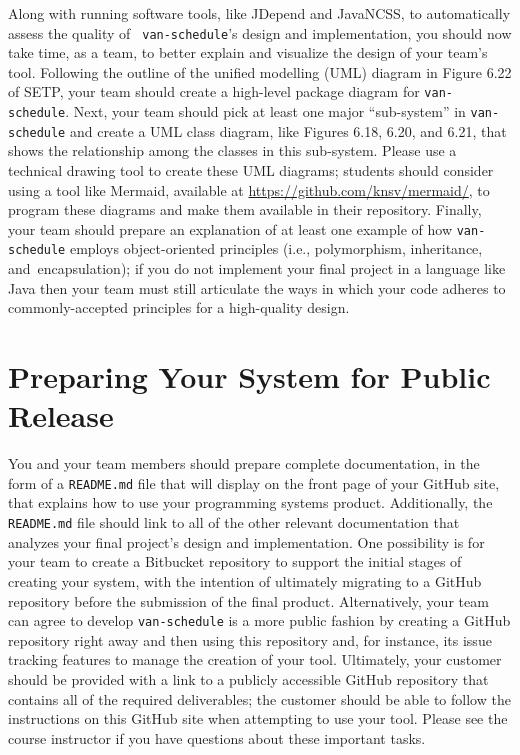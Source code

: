 Along with running software tools, like JDepend and JavaNCSS, to automatically assess the quality of {\tt
van-schedule}'s design and implementation, you should now take time, as a team, to better explain and visualize the
design of your team's tool. Following the outline of the unified modelling (UML) diagram in Figure 6.22 of SETP,
your team should create a high-level package diagram for {\tt van-schedule}. Next, your team should pick at least one
major ``sub-system'' in {\tt van-schedule} and create a UML class diagram, like Figures 6.18, 6.20, and 6.21, that shows
the relationship among the classes in this sub-system. Please use a technical drawing tool to create these UML diagrams;
students should consider using a tool like Mermaid, available at \url{https://github.com/knsv/mermaid/}, to program
these diagrams and make them available in their repository. Finally, your team should prepare an explanation of at least
one example of how {\tt van-schedule} employs object-oriented principles (i.e., polymorphism, inheritance, \mbox{and
encapsulation)}; if you do not implement your final project in a language like Java then your team must still articulate
the ways in which your code adheres to commonly-accepted principles for a high-quality design.

\vspace*{-.2in}
\section*{Preparing Your System for Public Release}

You and your team members should prepare complete documentation, in the form of a {\tt README.md} file that will display
on the front page of your GitHub site, that explains how to use your programming systems product. Additionally, the {\tt
README.md} file should link to all of the other relevant documentation that analyzes your final project's design and
implementation. One possibility is for your team to create a Bitbucket repository to support the initial stages of
creating your system, with the intention of ultimately migrating to a GitHub repository before the submission of the
final product. Alternatively, your team can agree to develop {\tt van-schedule} is a more public fashion by creating a
GitHub repository right away and then using this repository and, for instance, its issue tracking features to manage the
creation of your tool. Ultimately, your customer should be provided with a link to a publicly accessible GitHub
repository that contains all of the required deliverables; the customer should be able to follow the instructions on
this GitHub site when attempting to use your tool. Please see the course instructor if you have questions about these
important tasks.


